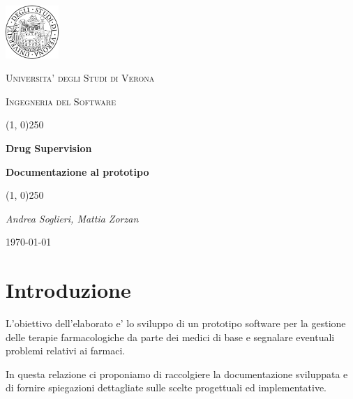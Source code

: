 \documentclass[a4paper, 11pt]{article}
\begin{document}
	\clearpage
	
	\begin{titlepage}
		\centering
		\vspace*{\fill}
		
		\includegraphics[width=0.15\textwidth]{logo.png}\par\vspace{1cm}
		{\scshape\LARGE Universita' degli Studi di Verona \par}
		\vspace{1cm}
		
		{\scshape\Large Ingegneria del Software \par}
		\vspace{1.5cm}
		\line(1, 0){250}
		
		{\huge\bfseries Drug Supervision\par}
		{\Large\bfseries Documentazione al prototipo \par}
		\line(1, 0){250}
		
		{\Large\itshape Andrea Soglieri, Mattia Zorzan \par}
		\vspace{5cm}
		\vspace*{\fill}
		
		{\Large \today\par}
	\end{titlepage}
	\thispagestyle{empty}
	\newpage
	\tableofcontents
	\newpage
	
	\section{Introduzione}
		L'obiettivo dell'elaborato e' lo sviluppo di un prototipo software per la gestione delle terapie farmacologiche da parte dei medici di base e segnalare eventuali problemi relativi ai farmaci.
		
		In questa relazione ci proponiamo di raccolgiere la documentazione sviluppata e di fornire spiegazioni dettagliate sulle scelte progettuali ed implementative.
\end{document}
